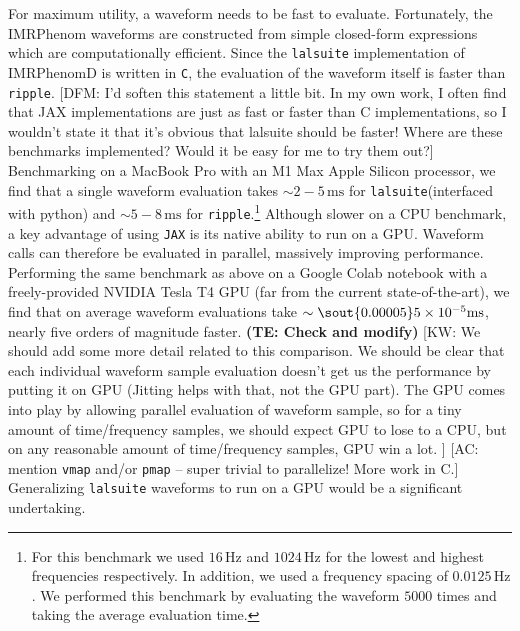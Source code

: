 \documentclass[twocolumn]{aastex631}
\newcommand{\jax}{\texttt{JAX}\xspace}
\newcommand{\ripple}{\texttt{ripple}\xspace}
\newcommand{\lalsuite}{\texttt{lalsuite}\xspace}
\newcommand{\te}[1]{\textbf{\color{pyGreen}(TE: #1)}}
\newcommand{\kw}[1]{{\color{rb4}[KW: #1 ]}}
\newcommand{\dfm}[1]{{\color{dfm}[DFM: #1]}}
\newcommand{\amc}[1]{{\color{red}[AC: #1]}}
\begin{document}
For maximum utility, a waveform needs to be fast to evaluate.
Fortunately, the IMRPhenom waveforms are constructed from simple closed-form expressions which are computationally efficient.
Since the \lalsuite implementation of IMRPhenomD is written in \texttt{C}, the evaluation of the waveform itself is faster than \ripple. \dfm{I'd soften this statement a little bit. In my own work, I often find that JAX implementations are just as fast or faster than C implementations, so I wouldn't state it that it's obvious that lalsuite should be faster! Where are these benchmarks implemented? Would it be easy for me to try them out?}
Benchmarking on a MacBook Pro with an M1 Max Apple Silicon processor, we find that a single waveform evaluation takes $\sim 2-5\,\mathrm{ms}$ for \lalsuite (interfaced with python) and $\sim 5-8\,\mathrm{ms}$ for \ripple.\footnote{
    For this benchmark we used $16\,\mathrm{Hz}$ and $1024\,\mathrm{Hz}$ for the lowest and highest frequencies respectively. 
    In addition, we used a frequency spacing of $0.0125\,\mathrm{Hz}$. 
    We performed this benchmark by evaluating the waveform $5000$ times and taking the average evaluation time.
}
Although slower on a CPU benchmark, a key advantage of using \jax is its native ability to run on a GPU.
Waveform calls can therefore be evaluated in parallel, massively improving performance.
Performing the same benchmark as above on a Google Colab notebook with a freely-provided NVIDIA Tesla T4 GPU (far from the current state-of-the-art), we find that on average waveform evaluations take $\sim \sout{0.00005} 5 \times 10^{-5}\mathrm{ms}$, nearly five orders of magnitude faster.
\te{Check and modify}
\kw{We should add some more detail related to this comparison. We should be clear that each individual waveform sample evaluation doesn't get us the performance by putting it on GPU (Jitting helps with that, not the GPU part). The GPU comes into play by allowing parallel evaluation of waveform sample, so for a tiny amount of time/frequency samples, we should expect GPU to lose to a CPU, but on any reasonable amount of time/frequency samples, GPU win a lot.}
\amc{mention \texttt{vmap} and/or \texttt{pmap} -- super trivial to parallelize! More work in C.}
Generalizing \lalsuite waveforms to run on a GPU would be a significant undertaking.
\end{document}
